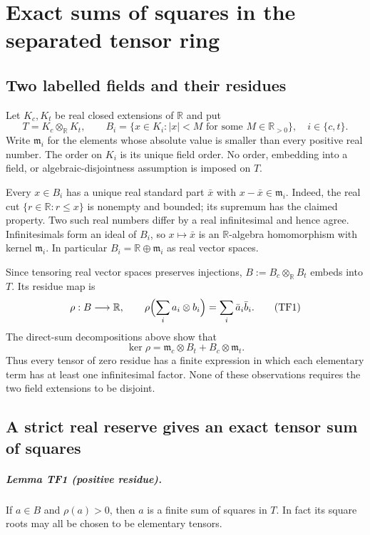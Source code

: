 \chapter{Exact sums of squares in the separated tensor ring}
\label{ch:tensor}
\section{Two labelled fields and their residues}
Let $K_c,K_t$ be real closed extensions of $\mathbb R$ and put
\[
 T=K_c\otimes_{\mathbb R}K_t,\qquad
 B_i=\{x\in K_i: |x|<M\text{ for some }M\in\mathbb R_{>0}\},
 \quad i\in\{c,t\}.
\]
Write $\mathfrak m_i$ for the elements whose absolute value is smaller
than every positive real number. The order on $K_i$ is its unique field
order. No order, embedding into a field, or algebraic-disjointness
assumption is imposed on $T$.

Every $x\in B_i$ has a unique real standard part $\bar x$ with
$x-\bar x\in\mathfrak m_i$. Indeed, the real cut
$\{r\in\mathbb R:r\le x\}$ is nonempty and bounded; its supremum
has the claimed property. Two such real numbers differ by a real
infinitesimal and hence agree. Infinitesimals form an ideal of $B_i$,
so $x\mapsto\bar x$ is an $\mathbb R$-algebra homomorphism with
kernel $\mathfrak m_i$. In particular
$B_i=\mathbb R\oplus\mathfrak m_i$ as real vector spaces.

Since tensoring real vector spaces preserves injections,
$B:=B_c\otimes_{\mathbb R}B_t$ embeds into $T$. Its residue map is
\[
 \rho:B\longrightarrow\mathbb R,\qquad
 \rho\Bigl(\sum_i a_i\otimes b_i\Bigr)=\sum_i\bar a_i\bar b_i.
 \tag{TF1}
\]
The direct-sum decompositions above show that
\[
 \ker\rho=\mathfrak m_c\otimes B_t+B_c\otimes\mathfrak m_t.
 \tag{TF2}
\]
Thus every tensor of zero residue has a finite expression in which
each elementary term has at least one infinitesimal factor. None of
these observations requires the two field extensions to be disjoint.

\section{A strict real reserve gives an exact tensor sum of squares}
\label{component:p25af2c58da7e}
\label{p25af2c58da7e:sec:mechanism}
\label{p25af2c58da7e:lem:residue}
\paragraph{Lemma TF1 (positive residue).}
If $a\in B$ and $\rho(a)>0$, then $a$ is a finite sum of squares in
$T$. In fact its square roots may all be chosen to be elementary
tensors.

